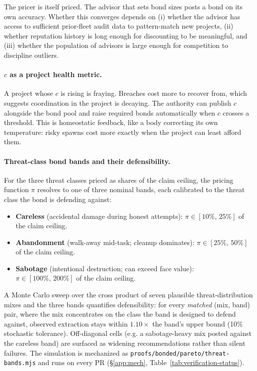 \documentclass[11pt,a4paper]{article}
\theoremstyle{definition}
\theoremstyle{remark}
\begin{document}
%
The pricer is itself priced. The advisor that sets bond sizes posts a bond on its own accuracy. Whether this converges depends on (i) whether the advisor has access to sufficient prior-fleet audit data to pattern-match new projects, (ii) whether reputation history is long enough for discounting to be meaningful, and (iii) whether the population of advisors is large enough for competition to discipline outliers.

\paragraph{$c$ as a project health metric.} A project whose $c$ is rising is fraying. Breaches cost more to recover from, which suggests coordination in the project is decaying. The authority can publish $c$ alongside the bond pool and raise required bonds automatically when $c$ crosses a threshold. This is homeostatic feedback, like a body correcting its own temperature: risky spawns cost more exactly when the project can least afford them.

\paragraph{Threat-class bond bands and their defensibility.}\label{sec:pricing:defensibility}
For the three threat classes priced as shares of the claim ceiling, the pricing function $\pi$ resolves to one of three nominal bands, each calibrated to the threat class the bond is defending against:
\begin{itemize}[nosep]
  \item \textbf{Careless} (accidental damage during honest attempts): $\pi \in [10\%,\,25\%]$ of the claim ceiling.
  \item \textbf{Abandonment} (walk-away mid-task; cleanup dominates): $\pi \in [25\%,\,50\%]$ of the claim ceiling.
  \item \textbf{Sabotage} (intentional destruction; can exceed face value): $\pi \in [100\%,\,200\%]$ of the claim ceiling.
\end{itemize}
A Monte Carlo sweep over the cross product of seven plausible threat-distribution mixes and the three bands quantifies defensibility: for every \emph{matched} (mix, band) pair, where the mix concentrates on the class the band is designed to defend against, observed extraction stays within $1.10\times$ the band's upper bound (10\% stochastic tolerance). Off-diagonal cells (e.g. a sabotage-heavy mix posted against the careless band) are surfaced as widening recommendations rather than silent failures. The simulation is mechanized as \texttt{proofs/bonded/pareto/threat-bands.mjs} and runs on every PR (\S\ref{app:mech}, Table~\ref{tab:verification-status}).
\end{document}
